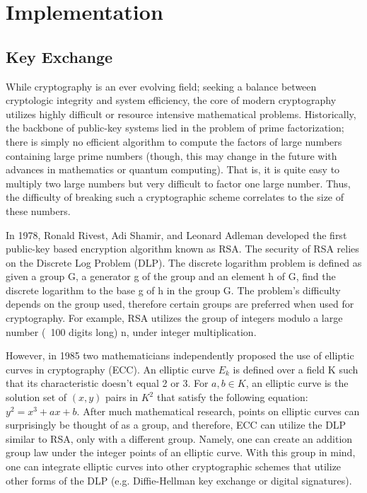 \section{Implementation}

\subsection{Key Exchange}
While cryptography is an ever evolving field; seeking a balance between cryptologic integrity and system efficiency, the core of modern cryptography utilizes highly difficult or resource intensive mathematical problems. Historically, the backbone of public-key systems lied in the problem of prime factorization; there is simply no efficient algorithm to compute the factors of large numbers containing large prime numbers (though, this may change in the future with advances in mathematics or quantum computing). That is, it is quite easy to multiply two large numbers but very difficult to factor one large number. Thus, the difficulty of breaking such a cryptographic scheme correlates to the size of these numbers.

In 1978, Ronald Rivest, Adi Shamir, and Leonard Adleman developed the first public-key based encryption algorithm known as RSA. The security of RSA relies on the Discrete Log Problem (DLP). The discrete logarithm problem is defined as given a group G, a generator g of the group and an element h of G, find the discrete logarithm to the base g of h in the group G. The problem's difficulty depends on the group used, therefore certain groups are preferred when used for cryptography. For example, RSA utilizes the group of integers modulo a large number (~100 digits long) n, under integer multiplication. 

However, in 1985 two mathematicians independently proposed the use of elliptic curves in cryptography (ECC). An elliptic curve $E_k$ is defined over a field K such that its characteristic doesn't equal 2 or 3. For $a,b \in K$, an elliptic curve is the solution set of $(x,y)$ pairs in $K^2$ that satisfy the following equation: $y^2 = x^3 + ax + b$. After much mathematical research, points on elliptic curves can surprisingly be thought of as a group, and therefore, ECC can utilize the DLP similar to RSA, only with a different group. Namely, one can create an addition group law under the integer points of an elliptic curve. With this group in mind, one can integrate elliptic curves into other cryptographic schemes that utilize other forms of the DLP (e.g. Diffie-Hellman key exchange or digital signatures).

